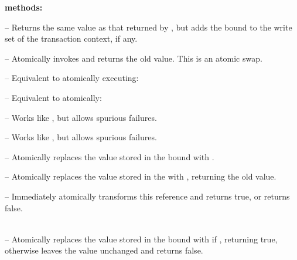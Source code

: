 \textbf{ methods:}
\begin{packed_itemize}
\setlength{\itemsep}{4pt}

\item {}-- Returns the same value as
that returned by , but adds the bound  to the write
set of the transaction context, if any.

\item {}\code{): }-- Atomically
invokes  and returns the old value.  This is an atomic swap.

\item {}\code{): }--
Equivalent to atomically executing:
\code{ \}}

\item {}\code{): }--
Equivalent to atomically:
\code{ \}}

\item {}\code{): }--
Works like , but allows spurious failures.

\item {}\code{): }--
Works like , but allows spurious failures.

\item {}\code{ => }\code{) }--
Atomically replaces the value  stored in the bound 
with .

\item {}\code{ => }\code{): }--
Atomically replaces the value  stored in the 
with , returning the old value.

\item {}\code{ => }\code{): }--
Immediately atomically transforms this reference and returns true,
or returns false.

\item {}\code{[}\code{,}\code{]):} \\
--
Atomically replaces the value  stored in the bound 
with  if , returning true, otherwise
leaves the value unchanged and returns false.

\end{packed_itemize}

